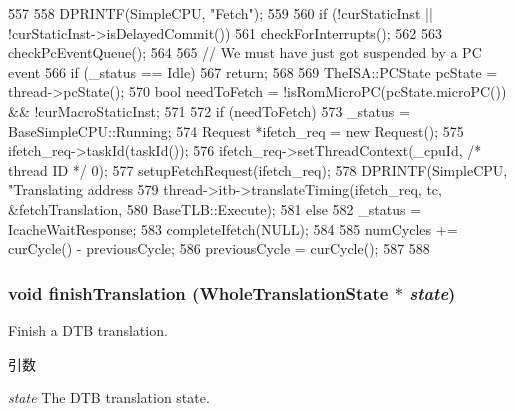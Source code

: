 \begin{DoxyCode}
557 {
558     DPRINTF(SimpleCPU, "Fetch\n");
559 
560     if (!curStaticInst || !curStaticInst->isDelayedCommit())
561         checkForInterrupts();
562 
563     checkPcEventQueue();
564 
565     // We must have just got suspended by a PC event
566     if (_status == Idle)
567         return;
568 
569     TheISA::PCState pcState = thread->pcState();
570     bool needToFetch = !isRomMicroPC(pcState.microPC()) && !curMacroStaticInst;
571 
572     if (needToFetch) {
573         _status = BaseSimpleCPU::Running;
574         Request *ifetch_req = new Request();
575         ifetch_req->taskId(taskId());
576         ifetch_req->setThreadContext(_cpuId, /* thread ID */ 0);
577         setupFetchRequest(ifetch_req);
578         DPRINTF(SimpleCPU, "Translating address %
579         thread->itb->translateTiming(ifetch_req, tc, &fetchTranslation,
580                 BaseTLB::Execute);
581     } else {
582         _status = IcacheWaitResponse;
583         completeIfetch(NULL);
584 
585         numCycles += curCycle() - previousCycle;
586         previousCycle = curCycle();
587     }
588 }
\end{DoxyCode}
\hypertarget{classTimingSimpleCPU_a36c2a28eca3086b67fc7168a37367e98}{
\subsubsection[{finishTranslation}]{\setlength{\rightskip}{0pt plus 5cm}void finishTranslation ({\bf WholeTranslationState} $\ast$ {\em state})}}
\label{classTimingSimpleCPU_a36c2a28eca3086b67fc7168a37367e98}
Finish a DTB translation. 
\begin{DoxyParams}{引数}
\item[{\em state}]The DTB translation state. \end{DoxyParams}



